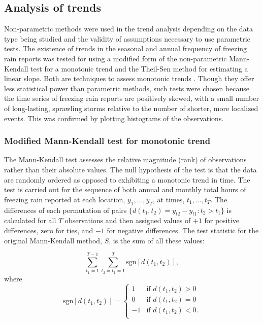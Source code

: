 \documentclass[twocol]{ametsoc}
\begin{document}
\subsection{Analysis of trends}
Non-parametric methods were used in the trend analysis depending on the data type being studied and the validity of assumptions necessary to use parametric tests. The existence of trends in the seasonal and annual frequency of freezing rain reports was tested for using a modified form of the non-parametric Mann-Kendall test for a monotonic trend and the Theil-Sen method for estimating a linear slope. Both are techniques to assess monotonic trends \citep{chandler2011statistical}. Though they offer less statistical power than parametric methods, such tests were chosen because the time series of freezing rain reports are positively skewed, with a small number of long-lasting, sprawling storms relative to the number of shorter, more localized events. This was confirmed by plotting histograms of the observations.

\subsubsection{Modified Mann-Kendall test for monotonic trend}
The Mann-Kendall test assesses the relative magnitude (rank) of observations rather than their absolute values. The null hypothesis of the test is that the data are randomly ordered as opposed to exhibiting a monotonic trend in time. The test is carried out for the sequence of both annual and monthly total hours of freezing rain reported at each location, $y_1,\ldots,y_T$, at times, $t_1,\ldots,t_T$. The differences of each permutation of pairs $\{d(t_1,t_2)=y_{t2}-y_{t1}:t_2>t_1\}$ is calculated for all $T$ observations and then assigned values of $+1$ for positive differences, zero for ties, and $-1$ for negative differences. The test statistic for the original Mann-Kendall method, $S$, is the sum of all these values:

\[\sum_{t_1=1}^{T-1}\sum_{t_2=t_1=1}^T\text{sgn}[d(t_1,t_2)],\] where\\

\[\text{sgn}[d(t_1,t_2)]=\begin{cases} 1 & \text{if } d(t_1,t_2)>0\\ 0 & \text{if } d(t_1,t_2)=0\\ -1 & \text{if } d(t_1,t_2)<0.\\ \end{cases}\]
\end{document}
